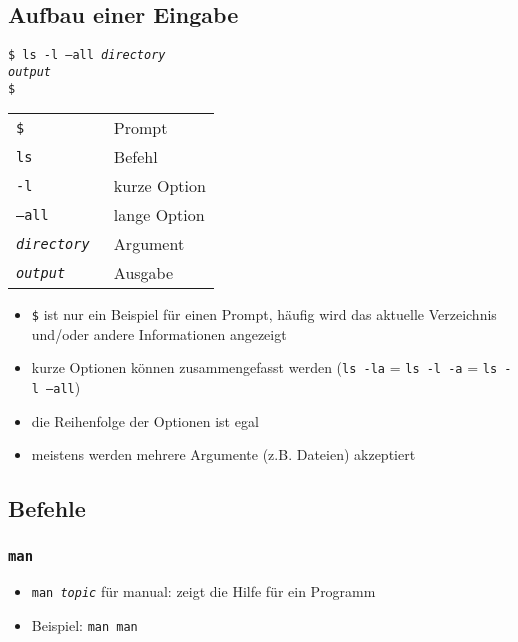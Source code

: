 \documentclass{article}
\begin{document}
    \subsection{Aufbau einer Eingabe}
      \texttt{\$ ls -l --all \textit{directory}\\
              \textit{output}\\
              \$}
      \begin{center}
        \begin{tabular}{>{\tt}l l}
          \toprule
          \$                 & Prompt       \\
          ls                 & Befehl       \\
          -l                 & kurze Option \\
          --all              & lange Option \\
          \textit{directory} & Argument     \\
          \textit{output}    & Ausgabe      \\
          \bottomrule
        \end{tabular}
      \end{center}
      \begin{itemize}
        \item \texttt{\$} ist nur ein Beispiel für einen Prompt, häufig wird das aktuelle Verzeichnis und/oder andere Informationen angezeigt
        \item kurze Optionen können zusammengefasst werden (\texttt{ls~-la} = \texttt{ls -l -a} = \texttt{ls -l --all})
        \item die Reihenfolge der Optionen ist egal
        \item meistens werden mehrere Argumente (z.B. Dateien) akzeptiert
      \end{itemize}

    \subsection{Befehle}
      \subsubsection{\texttt{man}}
        \begin{itemize}
          \item \texttt{man \textit{topic}} für manual: zeigt die Hilfe für ein Programm
          \item Beispiel: \texttt{man man}
        \end{itemize}
\end{document}
